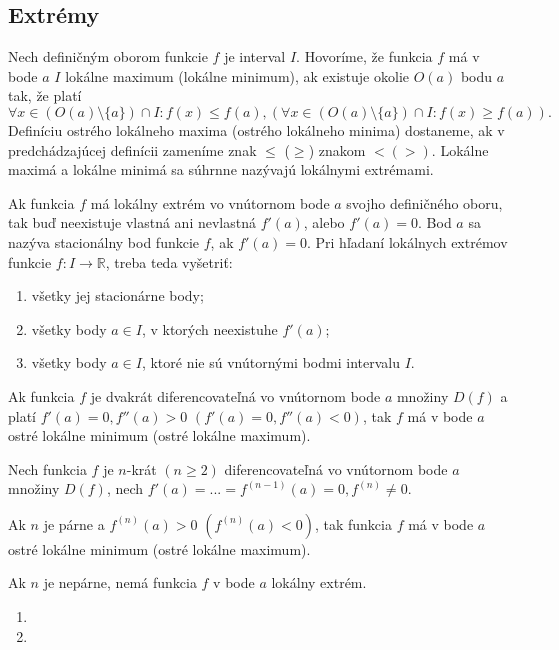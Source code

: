 \subsection{Extrémy}
Nech definičným oborom funkcie $f$ je interval $I$. Hovoríme, že funkcia $f$ má v bode $a$ $I$ lokálne maximum (lokálne minimum), ak existuje okolie $O(a)$ bodu $a$ tak, že platí 
$$\forall x\in (O(a)\setminus \{a\})\cap I:f(x)\leq f(a),(\forall x\in (O(a)\setminus \{a\})\cap I:f(x)\geq f(a)).$$
Definíciu ostrého lokálneho maxima (ostrého lokálneho minima) dostaneme, ak v predchádzajúcej definícii zameníme znak $\leq$ ($\geq$) znakom $<(>)$. Lokálne maximá a lokálne minimá sa súhrnne nazývajú lokálnymi extrémami.

\begin{veta}
Ak funkcia $f$ má lokálny extrém vo vnútornom bode $a$ svojho definičného oboru, tak buď neexistuje vlastná ani nevlastná $f'(a)$, alebo $f'(a)=0$.
Bod $a$ sa nazýva stacionálny bod funkcie $f$, ak $f'(a)=0$.
Pri hľadaní lokálnych extrémov funkcie $f:I\rightarrow\mathbb{R}$, treba teda vyšetriť:
\begin{enumerate}
\item všetky jej stacionárne body;
\item všetky body $a\in I$, v ktorých neexistuhe $f'(a)$;
\item všetky body $a\in I$, ktoré nie sú vnútornými bodmi intervalu $I$.
\end{enumerate}
\end{veta}

\begin{veta}
Ak funkcia $f$ je dvakrát diferencovateľná vo vnútornom bode $a$ množiny $D(f)$ a platí $f'(a)=0,f''(a)>0$  $(f'(a)=0,f''(a)<0)$, tak $f$ má v bode $a$ ostré lokálne minimum (ostré lokálne maximum).
\end{veta}

\begin{veta}
Nech funkcia $f$ je $n$-krát $(n\geq 2)$ diferencovateľná vo vnútornom bode $a$ množiny $D(f)$, nech $f'(a)=...=f^{(n-1)}(a)=0,f^{(n)}\neq 0$.

Ak $n$ je párne a $f^{(n)}(a)>0$  $(f^{(n)}(a)<0)$, tak funkcia $f$ má v bode $a$ ostré lokálne minimum (ostré lokálne maximum).

Ak $n$ je nepárne, nemá funkcia $f$ v bode $a$ lokálny extrém.
\end{veta}

\begin{enumerate}[resume]
	\item {}
	\item {}
\end{enumerate}

